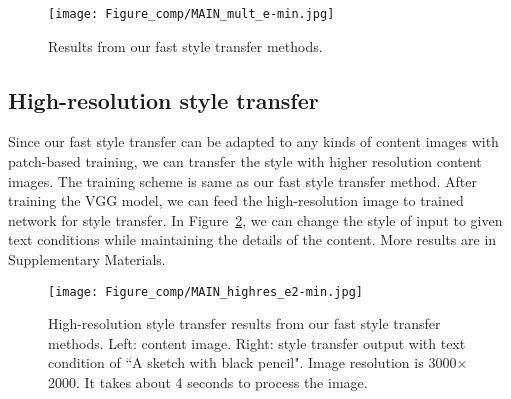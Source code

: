 \documentclass[10pt,twocolumn,letterpaper]{article}
\begin{document}
\begin{figure}[!t]
\centering
  \texttt{[image: Figure\_comp/MAIN\_mult\_e-min.jpg]}
  \vspace*{-0.5cm}
\caption{Results from our fast style transfer methods.}%
\vspace*{-.4cm}
\label{fig:result_mult}
\end{figure}



\subsection{High-resolution style transfer}

Since our fast style transfer can be adapted to any kinds of content images with patch-based training, we can transfer the style with higher resolution content images. The training scheme is same as our fast style transfer method. After training the VGG model, we can feed the high-resolution image to trained network for style transfer. In Figure~\ref{fig:highres}, we can change the style of input to given text conditions while maintaining the details of the content. More results are in Supplementary Materials.



\begin{figure}[!t]
\centering
    
  \texttt{[image: Figure\_comp/MAIN\_highres\_e2-min.jpg]}
\vspace*{-.5cm}
\caption{High-resolution style transfer results from our fast style transfer methods. Left: content image. Right: style transfer output with text condition of ``A sketch with black pencil". Image resolution is 3000$\times$2000. It takes about 4 seconds to process the image. }
 \vspace*{-.4cm}
\label{fig:highres}
\end{figure}

\end{document}
